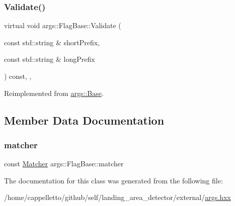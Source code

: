 \subsubsection{\texorpdfstring{Validate()}{Validate()}}
{\footnotesize\ttfamily virtual void args\+::\+Flag\+Base\+::\+Validate (\begin{DoxyParamCaption}\item[{const std\+::string \&}]{short\+Prefix,  }\item[{const std\+::string \&}]{long\+Prefix }\end{DoxyParamCaption}) const\hspace{0.3cm}{\ttfamily [inline]}, {\ttfamily [override]}, {\ttfamily [virtual]}}



Reimplemented from \hyperlink{classargs_1_1_base_a62ea917978306062785cbfaa4dd51d2f}{args\+::\+Base}.



\subsection{Member Data Documentation}
\mbox{\label{classargs_1_1_flag_base_a8035f87d3cbd70a8a57c7a77f2c5d8f1}} 
\subsubsection{\texorpdfstring{matcher}{matcher}}
{\footnotesize\ttfamily const \hyperlink{classargs_1_1_matcher}{Matcher} args\+::\+Flag\+Base\+::matcher\hspace{0.3cm}{\ttfamily [protected]}}



The documentation for this class was generated from the following file\+:\begin{DoxyCompactItemize}
\item 
/home/cappelletto/github/self/landing\+\_\+area\+\_\+detector/external/\hyperlink{args_8hxx}{args.\+hxx}\end{DoxyCompactItemize}
